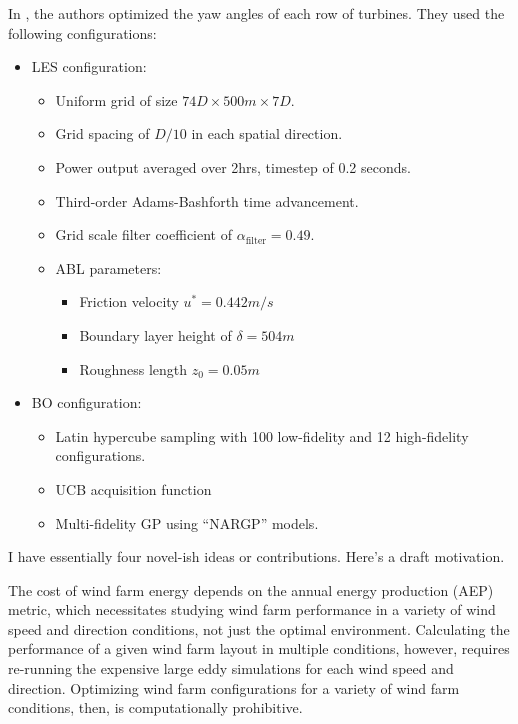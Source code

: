 \documentclass[12pt]{article}
\begin{document}
In \cite{moleMultiFidelityBayesianOptimisation2024}, the authors optimized the
yaw angles of each row of turbines. They used the following configurations:
\begin{itemize}
    \item LES configuration:
        \begin{itemize}
            \item Uniform grid of size $74D \times 500m \times 7D$.
            \item Grid spacing of $D / 10$ in each spatial direction.
            \item Power output averaged over 2hrs, timestep of 0.2 seconds.
            \item Third-order Adams-Bashforth time advancement.
            \item Grid scale filter coefficient of $\alpha_\text{filter} = 0.49$.
            \item ABL parameters:
                \begin{itemize}
                    \item Friction velocity $u^* = 0.442 m / s$
                    \item Boundary layer height of $\delta = 504m$
                    \item Roughness length $z_{0} = 0.05m$
                \end{itemize}
        \end{itemize}
    \item BO configuration:
        \begin{itemize}
            \item Latin hypercube sampling with 100 low-fidelity and 12
                high-fidelity configurations.
            \item UCB acquisition function
            \item Multi-fidelity GP using ``NARGP'' models.
        \end{itemize}
\end{itemize}

I have essentially four novel-ish ideas or contributions. Here's a draft motivation.

The cost of wind farm energy depends on the annual energy production (AEP) metric, which
necessitates studying wind farm performance in a variety of wind speed and direction conditions,
not just the optimal environment. Calculating the performance of a given wind farm layout in
multiple conditions, however, requires re-running the expensive large eddy simulations for
each wind speed and direction. Optimizing wind farm configurations for a variety of wind farm
conditions, then, is computationally prohibitive.
\end{document}
